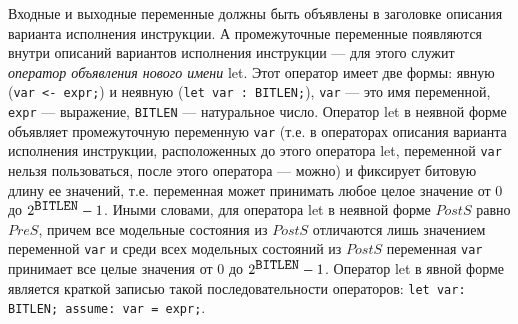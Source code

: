 Входные и выходные переменные должны быть объявлены в заголовке описания варианта исполнения инструкции. А промежуточные переменные появляются внутри описаний вариантов исполнения инструкции --- для этого служит \emph{оператор объявления нового имени} let. Этот оператор имеет две формы: явную (\texttt{var <- expr;}) и неявную (\texttt{let var : BITLEN;}), \texttt{var} --- это имя переменной, \texttt{expr} --- выражение, \texttt{BITLEN} --- натуральное число. Оператор let в неявной форме объявляет промежуточную переменную \texttt{var} (т.е. в операторах описания варианта исполнения инструкции, расположенных до этого оператора let, переменной \texttt{var} нельзя пользоваться, после этого оператора --- можно) и фиксирует битовую длину ее значений, т.е. переменная может принимать любое целое значение от 0 до $2^{\mbox{\texttt{BITLEN}}}-1$. Иными словами, для оператора let в неявной форме $PostS$ равно $PreS$, причем все модельные состояния из $PostS$ отличаются лишь значением переменной \texttt{var} и среди всех модельных состояний из $PostS$ переменная \texttt{var} принимает все целые значения от 0 до $2^{\mbox{\texttt{BITLEN}}}-1$. Оператор let в явной форме является краткой записью такой последовательности операторов: \texttt{let var: BITLEN; assume: var = expr;}.

